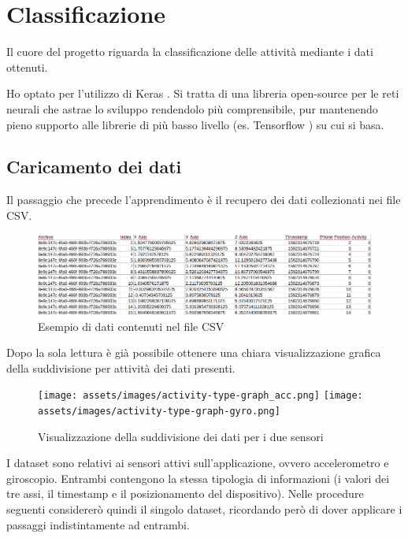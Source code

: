 \chapter{Classificazione}
\label{chapter:classification}

Il cuore del progetto riguarda la classificazione delle attività mediante i dati ottenuti. 

Ho optato per l'utilizzo di Keras \cite{keras}.
Si tratta di una libreria open-source per le reti neurali che astrae lo sviluppo rendendolo più comprensibile, 
pur mantenendo pieno supporto alle librerie di più basso livello (es. Tensorflow \cite{tensorflow}) su cui si basa.


\section{Caricamento dei dati}
Il passaggio che precede l'apprendimento è il recupero dei dati collezionati nei file CSV.

\begin{figure}[H]
    \centering
    \includegraphics[scale = 0.40]{assets/images/examples/dataset-data-example.png}
    \caption{Esempio di dati contenuti nel file CSV}
\end{figure}

Dopo la sola lettura è già possibile ottenere una chiara visualizzazione grafica della suddivisione per attività dei dati presenti.

\begin{figure}[H]
    \centering
    \texttt{[image: assets/images/activity-type-graph\_acc.png]}
    \centering
    \texttt{[image: assets/images/activity-type-graph-gyro.png]}
    \caption{Visualizzazione della suddivisione dei dati per i due sensori}
\end{figure}


\newpage
I dataset sono relativi ai sensori attivi sull'applicazione, ovvero accelerometro e giroscopio.
Entrambi contengono la stessa tipologia di informazioni (i valori dei tre assi, il timestamp e il posizionamento del dispositivo). 
Nelle procedure seguenti considererò quindi il singolo dataset, ricordando però di dover applicare i passaggi indistintamente ad entrambi.

